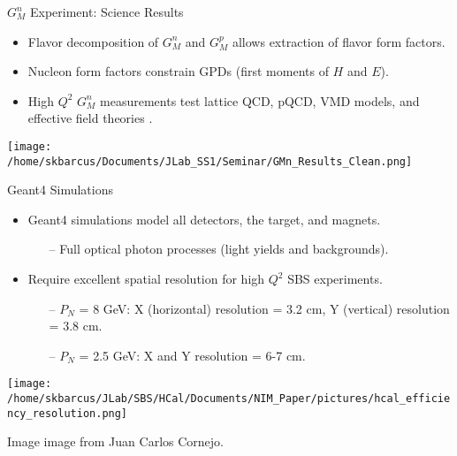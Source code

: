 \documentclass[10pt]{beamer}
\begin{document}
\begin{frame}{$G_M^n$ Experiment: Science Results}

		\begin{itemize}
			\item Flavor decomposition of $G_M^n$ and $G_M^p$ allows extraction of flavor form factors.
			\item Nucleon form factors constrain GPDs (first moments of $H$ and $E$).
			\item High $Q^2$ $G_M^n$ measurements test lattice QCD, pQCD, VMD models, and effective field theories \parencite{gmn_slides,gmn}.
		\end{itemize}

	\begin{center}
		\texttt{[image: /home/skbarcus/Documents/JLab\_SS1/Seminar/GMn\_Results\_Clean.png]}
	\end{center}

\end{frame}

\begin{frame}{Geant4 Simulations}
	
	\vspace{-2mm}
	\begin{itemize}
		\item Geant4 simulations model all detectors, the target, and magnets.
			\begin{itemize}
				\item[--] Full optical photon processes (light yields and backgrounds).
			\end{itemize}
		\item Require excellent spatial resolution for high $Q^2$ SBS experiments. 
			\begin{itemize}
				\item[--] $P_N$ = 8 GeV: X (horizontal) resolution = 3.2 cm, Y (vertical) resolution = 3.8 cm.
				\item[--] $P_N$ = 2.5 GeV: X and Y resolution = 6-7 cm.
			\end{itemize}
	\end{itemize}
	
	\vspace{-2mm}
	\begin{center}
  		\texttt{[image: /home/skbarcus/JLab/SBS/HCal/Documents/NIM\_Paper/pictures/hcal\_efficiency\_resolution.png]}
  	\end{center}
  	\vspace{-5mm}
	\tiny{Image image from Juan Carlos Cornejo.}
	
\end{frame}
\end{document}
